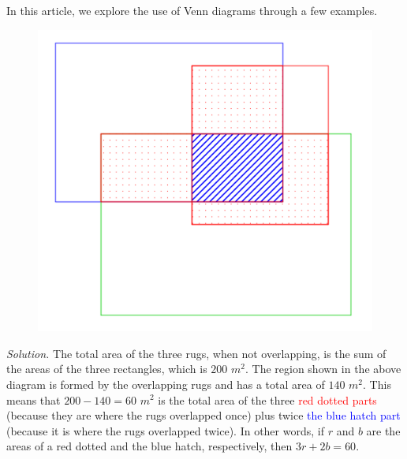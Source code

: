\begin{multicols}{2}
	In this article, we explore the use of Venn diagrams through a few examples.
	\vskip 0.2cm
	\begin{figure}[H]
		\vspace*{-5pt}
		\centering
		\captionsetup{labelformat= empty, justification=centering}
		\includegraphics[width= 1\linewidth]{pi-2023-01-01.pdf}
		\vspace*{-15pt}
	\end{figure}
	\textit{Solution.}
	The total area of the three rugs, when not overlapping, is the sum of the areas of the three rectangles, which is $200$ $m^2.$
	The region shown in the above diagram is formed by the overlapping rugs and has a total area of $140$ $m^2.$
	This means that $200-140=60$ $m^2$ is the total area of the three \textcolor{red}{red dotted parts}
	(because they are where the rugs overlapped once) plus twice \textcolor{blue}{the blue hatch part}
	(because it is where the rugs overlapped twice).
	\vskip 0.1cm
	In other words, if $r$ and $b$ are the areas of a red dotted and the blue hatch, respectively, then $3r + 2b = 60.$

\end{multicols}
